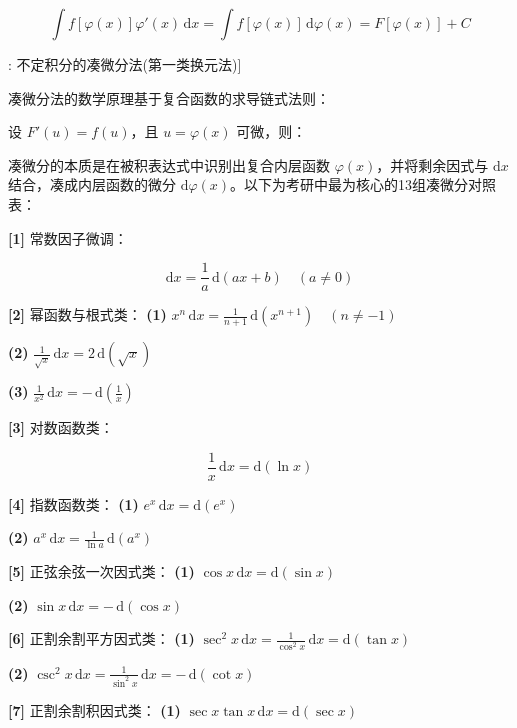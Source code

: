 \documentclass[11pt,a4paper,UTF8]{ctexart}
\begin{document}
\begin{equation*}
\int f[\varphi(x)]\varphi'(x)\,\mathrm{d}x = \int f[\varphi(x)]\,\mathrm{d}\varphi(x) = F[\varphi(x)] + C
\end{equation*}
\begin{thmbox}[方法[1]: 不定积分的凑微分法(第一类换元法)]

凑微分法的数学原理基于复合函数的求导链式法则：

设 $F'(u) = f(u)$，且 $u = \varphi(x)$ 可微，则：


凑微分的本质是在被积表达式中识别出复合内层函数 $\varphi(x)$，并将剩余因式与 $\mathrm{d}x$ 结合，凑成内层函数的微分 $\mathrm{d}\varphi(x)$。以下为考研中最为核心的13组凑微分对照表：

\textbf{[1]} 常数因子微调：

\begin{equation*}
\mathrm{d}x = \frac{1}{a}\,\mathrm{d}(ax + b) \quad (a \neq 0)
\end{equation*}


\textbf{[2]} 幂函数与根式类：
\textbf{(1)}  $x^n\,\mathrm{d}x = \frac{1}{n+1}\,\mathrm{d}(x^{n+1}) \quad (n \neq -1)$

\textbf{(2)}  $\frac{1}{\sqrt{x}}\,\mathrm{d}x = 2\,\mathrm{d}(\sqrt{x})$

\textbf{(3)}  $\frac{1}{x^2}\,\mathrm{d}x = -\,\mathrm{d}\left(\frac{1}{x}\right)$

\textbf{[3]} 对数函数类：

\begin{equation*}
\frac{1}{x}\,\mathrm{d}x = \mathrm{d}(\ln x)
\end{equation*}


\textbf{[4]} 指数函数类：
\textbf{(1)}  $e^x\,\mathrm{d}x = \mathrm{d}(e^x)$

\textbf{(2)}  $a^x\,\mathrm{d}x = \frac{1}{\ln a}\,\mathrm{d}(a^x)$

\textbf{[5]} 正弦余弦一次因式类：
\textbf{(1)}  $\cos x\,\mathrm{d}x = \mathrm{d}(\sin x)$

\textbf{(2)}  $\sin x\,\mathrm{d}x = -\,\mathrm{d}(\cos x)$

\textbf{[6]} 正割余割平方因式类：
\textbf{(1)}  $\sec^2 x\,\mathrm{d}x = \frac{1}{\cos^2 x}\,\mathrm{d}x = \mathrm{d}(\tan x)$

\textbf{(2)}  $\csc^2 x\,\mathrm{d}x = \frac{1}{\sin^2 x}\,\mathrm{d}x = -\,\mathrm{d}(\cot x)$

\textbf{[7]} 正割余割积因式类：
\textbf{(1)}  $\sec x\tan x\,\mathrm{d}x = \mathrm{d}(\sec x)$


\end{thmbox}
\end{document}
